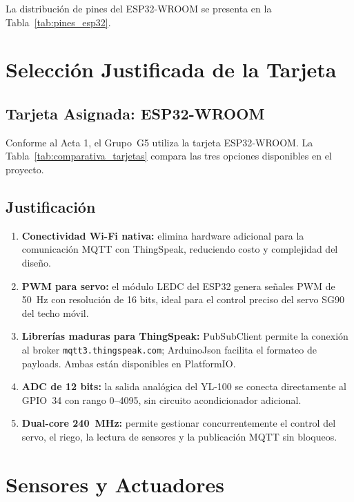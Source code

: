 La distribución de pines del ESP32-WROOM se presenta en la Tabla~\ref{tab:pines_esp32}.



\section{Selección Justificada de la Tarjeta}

\subsection{Tarjeta Asignada: ESP32-WROOM}

Conforme al Acta 1, el Grupo~G5 utiliza la tarjeta ESP32-WROOM. La Tabla~\ref{tab:comparativa_tarjetas} compara las tres opciones disponibles en el proyecto.



\subsection{Justificación}

\begin{enumerate}
    \item \textbf{Conectividad Wi-Fi nativa:} elimina hardware adicional para la comunicación MQTT con ThingSpeak, reduciendo costo y complejidad del diseño.
    \item \textbf{PWM para servo:} el módulo LEDC del ESP32 genera señales PWM de 50~Hz con resolución de 16 bits, ideal para el control preciso del servo SG90 del techo móvil.
    \item \textbf{Librerías maduras para ThingSpeak:} PubSubClient permite la conexión al broker \texttt{mqtt3.thingspeak.com}; ArduinoJson facilita el formateo de payloads. Ambas están disponibles en PlatformIO.
    \item \textbf{ADC de 12 bits:} la salida analógica del YL-100 se conecta directamente al GPIO~34 con rango 0--4095, sin circuito acondicionador adicional.
    \item \textbf{Dual-core 240~MHz:} permite gestionar concurrentemente el control del servo, el riego, la lectura de sensores y la publicación MQTT sin bloqueos.
\end{enumerate}

\section{Sensores y Actuadores}

